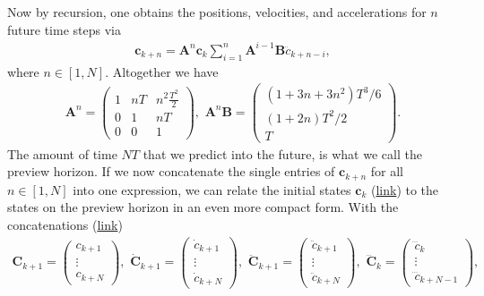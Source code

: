 Now by recursion, one obtains the positions, velocities, and accelerations for $n$ future time steps via
\begin{align}
	\bm{c}_{k+n} = \bm{A}^n\bm{c}_k\sum_{i=1}^n \bm{A}^{i-1}\bm{B}\dddot{c}_{k+n-i},
\end{align}
where $n\in[1,N]$. Altogether we have
\begin{align}
	\bm{A}^n = \begin{pmatrix}
	1 & nT & n^2\frac{T^2}{2} \\
	0 & 1 & nT \\
	0 & 0 & 1
	\end{pmatrix},\,\,
	\bm{A}^n\bm{B} = \begin{pmatrix}
	(1+3n+3n^2)T^3/6 \\
	(1+2n)T^2/2 \\
	T
	\end{pmatrix}.
\end{align}
The amount of time $NT$ that we predict into the future, is what we call the preview horizon. If we now concatenate the single entries of $\bm{c}_{k+n}$ for all $n\in[1,N]$ into one expression, we can relate the initial states $\bm{c}_k$ (\href{https://github.com/mhubii/nmpc_pattern_generator/blob/5a213044c927dc6aac9f7e32ce1e5fb472cd67bb/libs/pattern_generator/include/pattern_generator/base_generator.h#L140}{link}) to the states on the preview horizon in an even more compact form. With the concatenations (\href{https://github.com/mhubii/nmpc_pattern_generator/blob/5a213044c927dc6aac9f7e32ce1e5fb472cd67bb/libs/pattern_generator/include/pattern_generator/base_generator.h#L146}{link})
\begin{align}
	\bm{C}_{k+1}=\begin{pmatrix}
	c_{k+1}\\
	\vdots\\
	c_{k+N}
	\end{pmatrix},\,\,
	\dot{\bm{C}}_{k+1}=\begin{pmatrix}
	\dot{c}_{k+1}\\
	\vdots\\
	\dot{c}_{k+N}
	\end{pmatrix},\,\,
	\ddot{\bm{C}}_{k+1}=\begin{pmatrix}
	\ddot{c}_{k+1}\\
	\vdots\\
	\ddot{c}_{k+N}
	\end{pmatrix},\,\,
	\dddot{\bm{C}}_{k}=\begin{pmatrix}
	\dddot{c}_{k}\\
	\vdots\\
	\dddot{c}_{k+N-1}
	\end{pmatrix},
\end{align}
